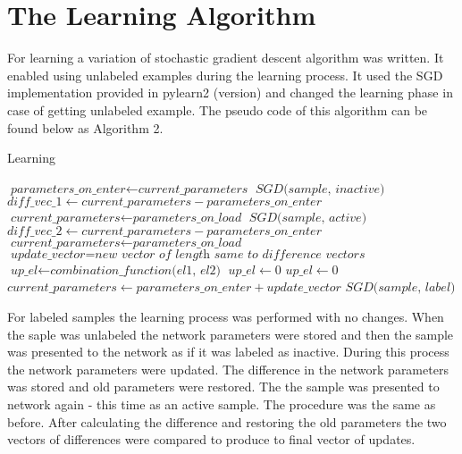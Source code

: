 \documentclass[a4paper,10pt]{report}
\begin{document}
      
      \section{The Learning Algorithm}
      For learning a variation of stochastic gradient descent algorithm was written. It enabled using unlabeled examples during the learning process. It used the SGD implementation provided in pylearn2 (version) and changed the learning phase in case of getting unlabeled example. The pseudo code of this algorithm can be found below as Algorithm 2.\\
      
      \begin{algorithm}
      \caption{Learning}\label{euclid}
      \begin{algorithmic}[1]
	\State $\textit{parameters\_on\_enter} \gets \textit{current\_parameters}$
	\State
	\State $\textit{SGD(sample, inactive)}$
	\State $\textit{diff\_vec\_1} \gets \textit{current\_parameters} -\textit{parameters\_on\_enter}$
	\State $\textit{current\_parameters} \gets \textit{parameters\_on\_load}$
	\State
	\State $\textit{SGD(sample, active)}$
	\State $\textit{diff\_vec\_2} \gets \textit{current\_parameters} - \textit{parameters\_on\_enter}$
	\State $\textit{current\_parameters} \gets \textit{parameters\_on\_load}$
	\State
	\State $\textit{update\_vector} = \textit{new vector of length same to difference vectors}$
	    \State $\textit{up\_el} \gets \textit{combination\_function(el1, el2)}$
	  \Else
	    \State $\textit{up\_el} \gets 0$
	  \EndIf
	\EndFor
	\State
	    \State $\textit{up\_el} \gets 0$
	  \EndIf
	\EndFor
	\State
	\State $\textit{current\_parameters} \gets \textit{parameters\_on\_enter} + \textit{update\_vector}$
	\Else
	\State $\textit{SGD(sample, label)}$
      \EndIf
      \State
      \EndProcedure
      \end{algorithmic}
      \end{algorithm}
      
      For labeled samples the learning process was performed with no changes. When the saple was unlabeled the network parameters were stored and then the sample was presented to the network as if it was labeled as inactive. During this process the network parameters were updated. The difference in the network parameters was stored and old parameters were restored. The the sample was presented to network again - this time as an active sample. The procedure was the same as before. After calculating the difference and restoring the old parameters the two vectors of differences were compared to produce to final vector of updates.\\
           
\end{document}
